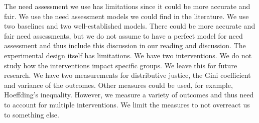 \documentclass{article} %
\begin{document}
The need assessment we use has limitations since it could be more accurate and fair. We use the need assessment models we could find in the literature. We use two baselines and two well-established models. There could be more accurate and fair need assessments, but we do not assume to have a perfect model for need assessment and thus include this discussion in our reading and discussion. The experimental design itself has limitations. We have two interventions. We do not study how the interventions impact specific groups. We leave this for future research. We have two measurements for distributive justice, the Gini coefficient and variance of the outcomes. Other measures could be used, for example, Hoeffding's inequality. However, we measure a variety of outcomes and thus need to account for multiple interventions. We limit the measures to not overreact us to something else.
\end{document}
